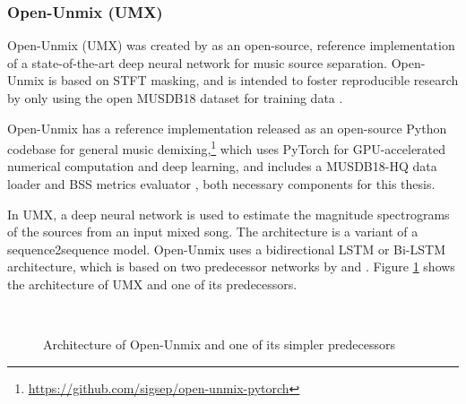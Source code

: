 \documentclass[report.tex]{subfiles}
\begin{document}
\subsubsection{Open-Unmix (UMX)}
\label{sec:umx}

Open-Unmix (UMX) was created by \textcite{umx} as an open-source, reference implementation of a state-of-the-art deep neural network for music source separation. Open-Unmix is based on STFT masking, and is intended to foster reproducible research by only using the open MUSDB18 dataset for training data \parencite{musdb18, musdb18hq}.

Open-Unmix \parencite{umx} has a reference implementation released as an open-source Python codebase for general music demixing,\footnote{\url{https://github.com/sigsep/open-unmix-pytorch}} which uses PyTorch \parencite{pytorch} for GPU-accelerated numerical computation and deep learning, and includes a MUSDB18-HQ data loader \parencite{musdb18hq} and BSS metrics evaluator \parencite{bss}, both necessary components for this thesis.

In UMX, a deep neural network is used to estimate the magnitude spectrograms of the sources from an input mixed song. The architecture is a variant of a sequence2sequence model. Open-Unmix uses a bidirectional LSTM or Bi-LSTM architecture, which is based on two predecessor networks by \textcite{umxorig1} and \textcite{umxorig2}. Figure \ref{fig:umxes} shows the architecture of UMX and one of its predecessors.

\begin{figure}[ht]
	\centering
	\\
	\caption{Architecture of Open-Unmix and one of its simpler predecessors}
	\label{fig:umxes}
\end{figure}
\end{document}
